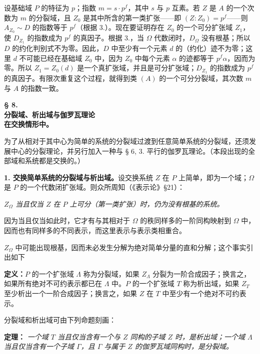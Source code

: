\documentclass[11pt]{article}
\providecommand{\srcspaced}[1]{#1}
\begin{document}
设基础域 \(P\) 的特征为 \(p\)；指数 \(m=s\cdot p^f\)，其中 \(s\) 与 \(p\) 互素。若 \(Z\) 是 \(A\) 的一个次数为 \(m\) 的分裂域，且 \(Z_0\) 是其中所含的第一类扩张——即 \((Z:Z_0)=p^f\)——则 \(A_{Z_0}\sim D\) 的指数等于 \(p^f\)（根据 3.）。现在要证明存在 \(Z_0\) 的一个可分扩张域 \(Z_1\)，使 \(D_{Z_1}\) 的指数成为 \(p^f\) 的真因子。根据 3.，当 \(\Omega\) 代数闭时，\(D_\Omega\) 没有根基；所以 \(D\) 的约化判别式不为零。因此，\(D\) 中至少有一个元素 \(d\) 的（约化）迹不为零；这里 \(d\) 不可能已经在基础域 \(Z_0\) 中，因为 \(Z_0\) 中每个元素 \(\alpha\) 的迹都等于 \(p^f\alpha\)，因而为零。所以 \(Z_1=Z_0(d)\) 是一个真扩张域，并且是可分扩张域；\(D_{Z_1}\) 的指数成为 \(p^f\) 的真因子。有限次重复这个过程，就得到类 \((A)\) 的一个可分分裂域，其次数 \(m\) 与 \(A\) 的指数一致。

\begin{center}
\textbf{§ 8.}\\[0.35em]
\textbf{分裂域、析出域与伽罗瓦理论\\
在交换情形中。}
\end{center}

为了从相对于其中心为简单的系统的分裂域过渡到任意简单系统的分裂域，还须发展中心的分裂理论，并另行加入一种与 § 6, 3. 平行的伽罗瓦理论。（本段出现的全部域和系统都是交换的。）

\noindent\textbf{\srcspaced{1. 交换简单系统的分裂域与析出域。}}\quad 设交换系统 \(Z\) 在 \(P\) 上简单，即为一个域；\(\Omega\) 是 \(P\) 的一个代数闭扩张域。则众所周知（《表示论》§21）：

\noindent\emph{\(Z_\Omega\) 当且仅当 \(Z\) 在 \(P\) 上可分（第一类扩张）时，仍为没有根基的系统。}

因为当且仅当如此时，它才有与其相对于 \(\Omega\) 的秩同样多的一阶同构映射到 \(\Omega\) 中，因而也有同样多的不同表示，而这里表示与表示类相重合。

\(Z_\Omega\) 中可能出现根基，因而未必发生分解为绝对简单分量的直和分解；这个事实引出如下

\noindent\textbf{\srcspaced{定义：}}\quad \(P\) 的一个扩张域 \(\Lambda\) 称为分裂域，如果 \(Z_\Lambda\) 分裂为一阶合成因子；换言之，如果所有绝对不可约表示都已在 \(\Lambda\) 中。\(P\) 的一个扩张域 \(T\) 称为析出域，如果 \(Z_T\) 至少析出一个一阶合成因子；换言之，如果 \(Z\) 在 \(T\) 中至少有一个绝对不可约表示。

分裂域和析出域可由下列命题刻画：

\noindent\textbf{\srcspaced{定理：}} \emph{一个域 \(T\) 当且仅当含有一个与 \(Z\) 同构的子域 \(Z\) 时，是析出域；一个域 \(\Lambda\) 当且仅当含有一个子域 \(\Gamma\)，且 \(\Gamma\) 与属于 \(Z\) 的伽罗瓦域同构时，是分裂域。}
\end{document}
